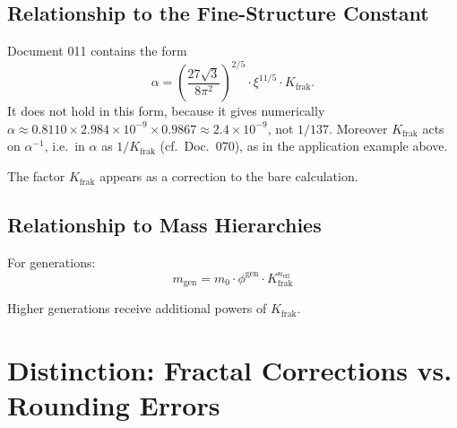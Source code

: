 	
	\subsection{Relationship to the Fine-Structure Constant}
	
	Document 011 contains the form
	\begin{equation}
		\alpha = \left(\frac{27\sqrt{3}}{8\pi^2}\right)^{2/5} \cdot \xi^{11/5} \cdot K_{\text{frak}}.
	\end{equation}
	It does not hold in this form, because it gives numerically $\alpha \approx 0.8110 \times 2.984\times10^{-9} \times 0.9867 \approx 2.4\times10^{-9}$, not $1/137$. Moreover $K_{\text{frak}}$ acts on $\alpha^{-1}$, i.e.\ in $\alpha$ as $1/K_{\text{frak}}$ (cf.\ Doc.~070), as in the application example above.
	
	The factor $K_{\text{frak}}$ appears as a correction to the bare calculation.
	
	\subsection{Relationship to Mass Hierarchies}
	
	For generations:
	\begin{equation}
		m_{\text{gen}} = m_0 \cdot \phi^{\text{gen}} \cdot K_{\text{frak}}^{n_{\text{eff}}}
	\end{equation}
	
	Higher generations receive additional powers of $K_{\text{frak}}$.
	
	\section{Distinction: Fractal Corrections vs. Rounding Errors}
	
